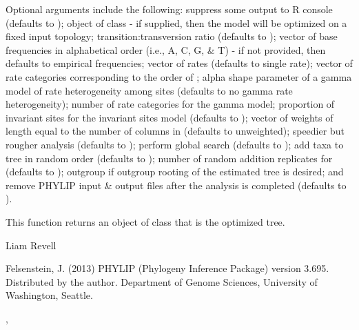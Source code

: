 \documentclass[a4paper]{book}
\begin{document}
%
\begin{Details}\relax
Optional arguments include the following:  suppress some output to R console (defaults to );  object of class  - if supplied, then the model will be optimized on a fixed input topology;  transition:transversion ratio (defaults to );  vector of base frequencies in alphabetical order (i.e., A, C, G, \& T) - if not provided, then defaults to empirical frequencies;  vector of rates (defaults to single rate);  vector of rate categories corresponding to the order of ;  alpha shape parameter of a gamma model of rate heterogeneity among sites (defaults to no gamma rate heterogeneity);  number of rate categories for the gamma model;  proportion of invariant sites for the invariant sites model (defaults to );  vector of weights of length equal to the number of columns in  (defaults to unweighted);  speedier but rougher analysis (defaults to );  perform global search (defaults to );  add taxa to tree in random order (defaults to );  number of random addition replicates for  (defaults to );  outgroup if outgroup rooting of the estimated tree is desired; and  remove PHYLIP input \& output files after the analysis is completed (defaults to ).
\end{Details}
%
\begin{Value}
This function returns an object of class  that is the optimized tree.
\end{Value}
%
\begin{Author}\relax
Liam Revell 
\end{Author}
%
\begin{References}\relax
Felsenstein, J. (2013) PHYLIP (Phylogeny Inference Package) version 3.695. Distributed by the author. Department of Genome Sciences, University of Washington, Seattle.
\end{References}
%
\begin{SeeAlso}\relax
{}, 
\end{SeeAlso}
\printindex{}
\end{document}

